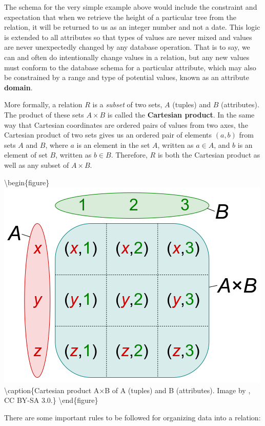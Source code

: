 \documentclass[
]{book}
\begin{document}
The schema for the very simple example above would include the constraint and expectation that when we retrieve the height of a particular tree from the relation, it will be returned to us as an integer number and not a date. This logic is extended to all attributes so that types of values are never mixed and values are never unexpectedly changed by any database operation. That is to say, we can and often do intentionally change values in a relation, but any new values must conform to the database schema for a particular attribute, which may also be constrained by a range and type of potential values, known as an attribute \textbf{domain}.

More formally, a relation \(R\) is a \emph{subset} of two sets, \(A\) (tuples) and \(B\) (attributes). The product of these sets \(A×B\) is called the \textbf{Cartesian product}. In the same way that Cartesian coordinates are ordered pairs of values from two axes, the Cartesian product of two sets gives us an ordered pair of elements \((a,b)\) from sets \(A\) and \(B\), where \(a\) is an element in the set \(A\), written as \(a∈A\), and \(b\) is an element of set \(B\), written as \(b∈B\). Therefore, \(R\) is both the Cartesian product as well as any subset of \(A×B\).

\textbackslash begin\{figure\}
\includegraphics[width=0.75\linewidth]{images/05-cartesian-product} \textbackslash caption\{Cartesian product A×B of A (tuples) and B (attributes). Image by \citet{quartl_english_2012}, CC BY-SA 3.0.\}\label{fig:5-cartesian-product}
\textbackslash end\{figure\}

There are some important rules to be followed for organizing data into a relation:
\end{document}

